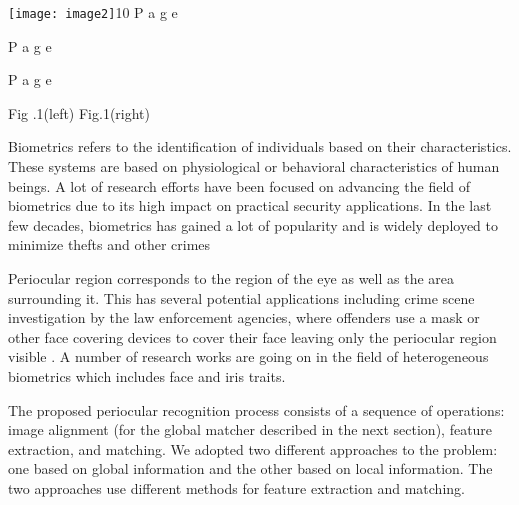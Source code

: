 \documentclass{article} %
\begin{document}
\noindent                                              \texttt{[image: image2]}10\textbf{ {\textbar} }P a g e\textbf{ }

\noindent  

\textbf{ {\textbar} }P a g e\textbf{ }

\noindent  

\textbf{ {\textbar} }P a g e\textbf{ }

\noindent  

\noindent 

\noindent                                                      Fig .1(left)                Fig.1(right)

\noindent                  Biometrics refers to the identification of individuals based on their characteristics. These systems are based on physiological or behavioral characteristics of human beings. A lot of research efforts have been focused on advancing the field of biometrics due to its high impact on practical security applications. In the last few decades, biometrics has gained a lot of popularity and is widely deployed to minimize thefts and other crimes

\noindent                  Periocular region corresponds to the region of the eye as well as the area surrounding it. This has several potential applications including crime scene investigation by the law enforcement agencies, where offenders use a mask or other face covering devices to cover their face leaving only the periocular region visible . A number of research works are going on in the field of heterogeneous biometrics which includes face and iris traits.

\noindent                    The proposed periocular recognition process consists of a sequence of operations: image alignment (for the global matcher described in the next section), feature extraction, and matching. We adopted two different approaches to the problem: one based on global information and the other based on local information. The two approaches use different methods for feature extraction and matching.~

\noindent 

\noindent \textbf{ }

\noindent \textbf{ }

\noindent \textbf{ }

\noindent \textbf{ }

\noindent \textbf{ }

\noindent 
\end{document}
